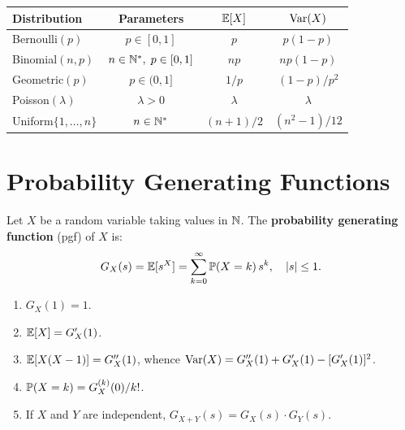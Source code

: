 \begin{keyformulas}[title=\textbf{Fundamental discrete distributions}]
\begin{center}
\renewcommand{\arraystretch}{1.4}
\begin{tabular}{lccc}
    \toprule
    \textbf{Distribution} & \textbf{Parameters} & $\mathbb{E}[X]$ & $\mathrm{Var}(X)$ \\
    \midrule
    Bernoulli$(p)$ & $p \in [0,1]$ & $p$ & $p(1-p)$ \\
    Binomial$(n,p)$ & $n \in \mathbb{N}^*,\; p \in [0,1]$ & $np$ & $np(1-p)$ \\
    Geometric$(p)$ & $p \in (0,1]$ & $1/p$ & $(1-p)/p^2$ \\
    Poisson$(\lambda)$ & $\lambda > 0$ & $\lambda$ & $\lambda$ \\
    Uniform$\{1,\ldots,n\}$ & $n \in \mathbb{N}^*$ & $(n+1)/2$ & $(n^2-1)/12$ \\
    \bottomrule
\end{tabular}
\end{center}
\end{keyformulas}

\section{Probability Generating Functions}

\begin{definition}
Let $X$ be a random variable taking values in $\mathbb{N}$. The \textbf{probability
generating function} (pgf) of $X$ is:
\[
    G_X(s) = \mathbb{E}[s^X] = \sum_{k=0}^{\infty} \mathbb{P}(X = k)\, s^k, \quad \left| s \right| \leq 1.
\]
\end{definition}

\begin{proposition}[Properties of $G_X$]
\begin{enumerate}[label=(\roman*)]
    \item $G_X(1) = 1$.
    \item $\mathbb{E}[X] = G_X'(1)$.
    \item $\mathbb{E}[X(X-1)] = G_X''(1)$, whence
          $\mathrm{Var}(X) = G_X''(1) + G_X'(1) - [G_X'(1)]^2$.
    \item $\mathbb{P}(X = k) = G_X^{(k)}(0)/k!$.
    \item If $X$ and $Y$ are independent, $G_{X+Y}(s) = G_X(s)\cdot G_Y(s)$.
\end{enumerate}
\end{proposition}

